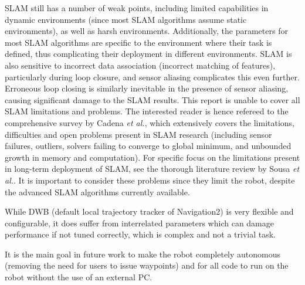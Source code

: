 SLAM still has a number of weak points, including limited capabilities in dynamic environments (since most SLAM algorithms assume static environments)\:\cite{siegwart_introduction_2011}\cite{sousa_systematic_2022}, as well as harsh environments\:\cite{cadena_past_2016}. 
Additionally, the parameters for most SLAM algorithms are specific to the environment where their task is defined, thus complicating their deployment in different environments\:\cite{khole_comprehensive_2023}.
SLAM is also sensitive to incorrect data association (incorrect matching of features), particularly during loop closure\:\cite{siegwart_introduction_2011}, and sensor aliasing complicates this even further\:\cite{cadena_past_2016}. 
Erroneous loop closing is similarly inevitable in the presence of sensor aliasing, causing significant damage to the SLAM results\:\cite{cadena_past_2016}.
This report is unable to cover all SLAM limitations and problems. The interested reader is hence refereed to the comprehensive survey by Cadena \textit{et al.}\:\cite{cadena_past_2016}, which extensively covers the limitations, difficulties and open problems present in SLAM research (including sensor failures, outliers, solvers failing to converge to global minimum, and unbounded growth in memory and computation). For specific focus on the limitations present in long-term deployment of SLAM, see the thorough literature review by Sousa \textit{et al.}\:\cite{sousa_systematic_2022}.
It is important to consider these problems since they limit the robot, despite the advanced SLAM algorithms currently available.


While DWB (default local trajectory tracker of Navigation2) is very flexible and configurable, it does suffer from interrelated parameters which can damage performance if not tuned correctly, which is complex and not a trivial task\:\cite{macenski_desks_2023}.


It is the main goal in future work to make the robot completely autonomous (removing the need for users to issue waypoints) and for all code to run on the robot without the use of an external PC.



